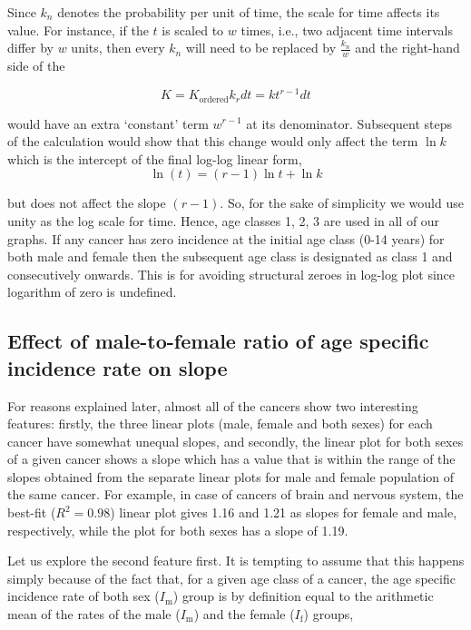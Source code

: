 \documentclass[lineno,sn-basic, Numbered]{sn-jnl}%
\theoremstyle{thmstyleone}%
\theoremstyle{thmstyletwo}%
\theoremstyle{thmstylethree}%
\begin{document}
Since \( k_n \) denotes the probability per unit of time, the scale for time affects its value. For instance, if the \( t \) is scaled to \( w \) times, i.e., two adjacent time intervals differ by \( w \) units, then every \( k_n \) will need to be replaced by \( \frac{k_n}{w} \) and the right-hand side of the

\begin{equation}
  K = K_{\text{ordered}} k_r dt = k t^{r-1} dt   
\end{equation}


would have an extra `constant' term \( w^{r-1} \) at its denominator. Subsequent steps of the calculation would show that this change would only affect the term \( \ln k \) which is the intercept of the final log-log linear form,
\begin{equation}
   \ln(t) = (r - 1) \ln t + \ln k 
\end{equation}


but does not affect the slope \( (r - 1) \). So, for the sake of simplicity we would use unity as the log scale for time. Hence, age classes 1, 2, 3 are used in all of our graphs. If any cancer has zero incidence at the initial age class (0-14 years) for both male and female then the subsequent age class is designated as class 1 and consecutively onwards. This is for avoiding structural zeroes in log-log plot since logarithm of zero is undefined.

\subsection{Effect of male-to-female ratio of age specific incidence rate on slope}
For reasons explained later, almost all of the cancers show two interesting features: firstly, the three linear plots (male, female and both sexes) for each cancer have somewhat unequal slopes, and secondly, the linear plot for both sexes of a given cancer shows a slope which has a value that is within the range of the slopes obtained from the separate linear plots for male and female population of the same cancer. For example, in case of cancers of brain and nervous system, the best-fit (\( R^2 = 0.98 \)) linear plot gives 1.16 and 1.21 as slopes for female and male, respectively, while the plot for both sexes has a slope of 1.19.

Let us explore the second feature first. It is tempting to assume that this happens simply because of the fact that, for a given age class of a cancer, the age specific incidence rate of both sex (\( I_{\text{m}} \)) group is by definition equal to the arithmetic mean of the rates of the male (\( I_{\text{m}} \)) and the female (\( I_{\text{f}} \)) groups,
\end{document}
